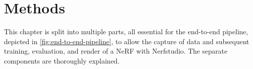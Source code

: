 \chapter{Methods}

This chapter is split into multiple parts, all essential for the end-to-end pipeline, depicted in \autoref{fig:end-to-end-pipeline}, to allow the capture of data and subsequent training, evaluation, and render of a NeRF with Nerfstudio. The separate components are thoroughly explained.




